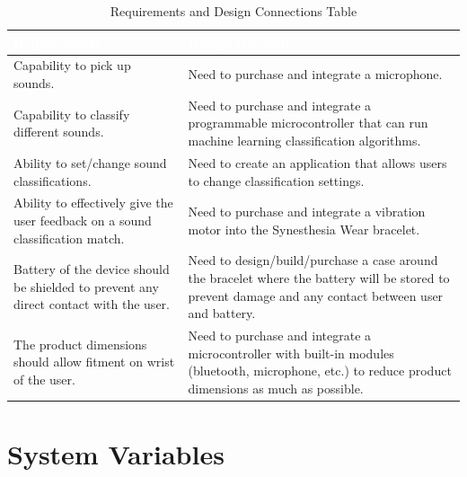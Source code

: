 \documentclass[12pt, titlepage]{article}
\begin{document}
\begin{table}[H]
  \centering
  \caption{Requirements and Design Connections Table}
  \label{table:Connections Table} 
  \begin{tabular}{|p{7cm}|p{7cm}|} 
  \hline
  \rowcolor[rgb]{0.071,0.49,0.698} \textcolor{white}{Requirements} & \textcolor{white}{Design Decision}                                          \\ 
  \hline
  \rowcolor[rgb]{0.675,0.827,0.902} Capability to pick up sounds.              & Need to purchase and integrate a microphone.\\
  \hline
  \rowcolor[rgb]{0.675,0.827,0.902} Capability to classify different sounds.              & Need to purchase and integrate a programmable microcontroller that can run machine learning classification algorithms.\\
  \hline
  \rowcolor[rgb]{0.675,0.827,0.902} Ability to set/change sound classifications.            & Need to create an application that allows users to change classification settings.\\    
  \hline
  \rowcolor[rgb]{0.675,0.827,0.902} Ability to effectively give the user feedback on a sound classification match.           & Need to purchase and integrate a vibration motor into the Synesthesia Wear bracelet.\\
  \hline
  \rowcolor[rgb]{0.675,0.827,0.902} Battery of the device should be shielded to prevent any direct contact with the user.           & Need to design/build/purchase a case around the bracelet where the battery will be stored to prevent damage and any contact between user and battery.\\
  \hline
  \rowcolor[rgb]{0.675,0.827,0.902} The product dimensions should allow fitment on wrist of the user.           & Need to purchase and integrate a microcontroller with built-in modules (bluetooth, microphone, etc.) to reduce product dimensions as much as possible.\\
  \hline
  \end{tabular}
\end{table}

\section{System Variables}
\end{document}
